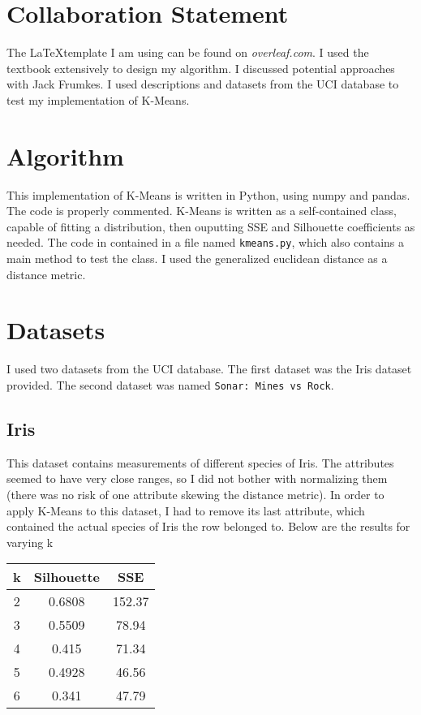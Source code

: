 \documentclass[12pt,letterpaper]{article}
\begin{document}
\section*{Collaboration Statement}

The \LaTeX template I am using can be found on \textit{overleaf.com}. I used the textbook extensively to design my algorithm. I discussed potential approaches with Jack Frumkes. I used descriptions and datasets from the UCI database to test my implementation of K-Means. 

\section{Algorithm}

This implementation of K-Means is written in Python, using numpy and pandas. The code is properly commented. K-Means is written as a self-contained class, capable of fitting a distribution, then ouputting SSE and Silhouette coefficients as needed. The code in contained in a file named \texttt{kmeans.py}, which also contains a main method to test the class. I used the generalized euclidean distance as a distance metric.


\section{Datasets}

I used two datasets from the UCI database. The first dataset was the Iris dataset provided. The second dataset was named \texttt{Sonar: Mines vs Rock}. 

\subsection{Iris}

This dataset contains measurements of different species of Iris. The attributes seemed to have very close ranges, so I did not bother with normalizing them (there was no risk of one attribute skewing the distance metric). In order to apply K-Means to this dataset, I had to remove its last attribute, which contained the actual species of Iris the row belonged to. Below are the results for varying k

\begin{center}
 \begin{tabular}{||c c c||} 
 \hline
 k & Silhouette & SSE \\ [0.5ex] 
 \hline\hline
 2 & 0.6808 & 152.37 \\ 
 \hline
 3 & 0.5509 & 78.94 \\
 \hline
 4 & 0.415 & 71.34 \\
 \hline
 5 & 0.4928 & 46.56 \\
 \hline
 6 & 0.341 & 47.79 \\ [1ex] 
 \hline
\end{tabular}
\end{center}
\end{document}

